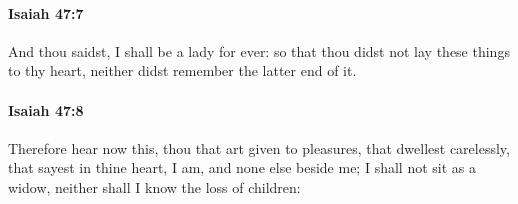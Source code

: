 		\paragraph{Isaiah 47:7} %
			\label{ISAIAH-47-7}

			And thou saidst, I shall be a lady for ever: so that thou didst not lay these things to thy heart, neither didst remember the latter end of it.


		\paragraph{Isaiah 47:8} %
			\label{ISAIAH-47-8}

			Therefore hear now this, thou that art given to pleasures, that dwellest carelessly, that sayest in thine heart, I am, and none else beside me; I shall not sit as a widow, neither shall I know the loss of children:


